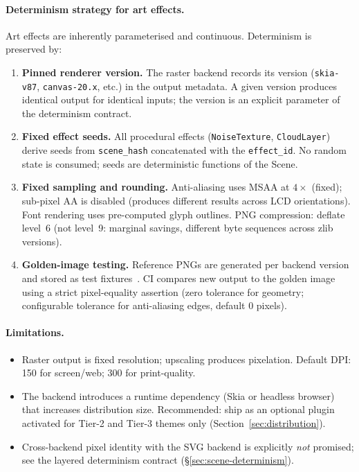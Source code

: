 \paragraph{Determinism strategy for art effects.}
Art effects are inherently parameterised and continuous. Determinism is preserved by:
\begin{enumerate}
  \item \textbf{Pinned renderer version.} The raster backend records its version
        (\texttt{skia-v87}, \texttt{canvas-20.x}, etc.) in the output metadata. A
        given version produces identical output for identical inputs; the version is an
        explicit parameter of the determinism contract.
  \item \textbf{Fixed effect seeds.} All procedural effects (\texttt{NoiseTexture},
        \texttt{CloudLayer}) derive seeds from \texttt{scene\_hash} concatenated with the
        \texttt{effect\_id}. No random state is consumed; seeds are deterministic functions
        of the Scene.
  \item \textbf{Fixed sampling and rounding.} Anti-aliasing uses MSAA at $4\times$ (fixed);
        sub-pixel AA is disabled (produces different results across LCD orientations).
        Font rendering uses pre-computed glyph outlines. PNG compression: deflate level~6
        (not level~9: marginal savings, different byte sequences across zlib versions).
  \item \textbf{Golden-image testing.} Reference PNGs are generated per backend version
        and stored as test fixtures~\cite{golden-image-testing}. CI compares new output
        to the golden image using a strict pixel-equality assertion (zero tolerance for
        geometry; configurable tolerance for anti-aliasing edges, default 0 pixels).
\end{enumerate}

\paragraph{Limitations.}
\begin{itemize}
  \item Raster output is fixed resolution; upscaling produces pixelation. Default DPI:
        150 for screen/web; 300 for print-quality.
  \item The backend introduces a runtime dependency (Skia or headless browser) that
        increases distribution size. Recommended: ship as an optional plugin activated
        for Tier-2 and Tier-3 themes only (Section~\ref{sec:distribution}).
  \item Cross-backend pixel identity with the SVG backend is explicitly \emph{not}
        promised; see the layered determinism contract (\S\ref{sec:scene-determinism}).
\end{itemize}

